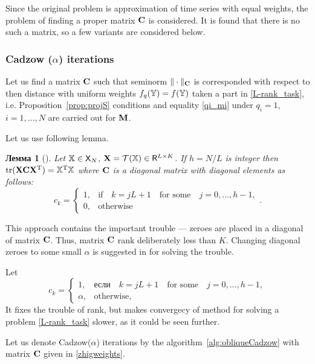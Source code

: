 \documentclass[12pt,a4paper,fleqn,leqno]{article}
\DeclareMathOperator{\tr}{tr}
\newtheorem{lemma}{Лемма}
\begin{document}
Since the original problem is approximation of time series with equal weights, the problem of finding a proper matrix $\mathbf{C}$ is considered.
It is found that there is no such a matrix, so a few variants are considered below.

\subsubsection{Cadzow ($\alpha$) iterations}
\label{sec:cadzow_alpha}
Let us find a matrix $\mathbf{C}$ such that seminorm $\|\cdot\|_{\mathbf{C}}$ is corresponded with respect to then distance with uniform weights $f_q(\mathbb{Y}) = f(\mathbb{Y})$ taken a part in \eqref{L-rank_task}, i.e. Proposition~\ref{prop:projS} conditions and equality \eqref{qi_mi} under $q_i = 1$, $i=1,\ldots,N$ are carried out for $\mathbf{M}$.

Let us use following lemma.

\begin{lemma}[\cite{Gillard2014}]
\label{zhiglemma}
Let $\mathbb{X} \in \mathsf{X}_N$, $\mathbf{X} = \mathcal{T}(\mathbb{X}) \in \mathsf{R}^{L \times K}$. If $h = N/L$ is integer then $\tr(\bfX \bfC \bfX^\rmT) = \tsX^\rmT \tsX$ where $\mathbf{C}$ is a diagonal matrix with diagonal elements as follows:
\begin{equation*}
c_k = \begin{cases}
1, & \text{if} \quad k = jL+1 \quad \text{for some} \quad j = 0, \ldots, h-1, \\
0, & \text{otherwise}
\end{cases}.
\end{equation*}
\end{lemma}

This approach contains the important trouble --- zeroes are placed in a diagonal of matrix $\mathbf{C}$. Thus, matrix $\mathbf{C}$ rank deliberately less than $K$. Changing diagonal zeroes to some small $\alpha$ is suggested in \cite{Gillard2014} for solving the trouble.

Let
\begin{equation}\label{zhigweights}
c_k = \begin{cases}
1, & \text{если} \quad k = jL+1 \quad \text{for some} \quad j = 0, \ldots, h-1, \\
\alpha, & \text{otherwise,}
\end{cases}
\end{equation}
It fixes the trouble of rank, but makes convergecy of method for solving a problem \eqref{L-rank_task} slower, as it could be seen further.

Let us denote Cadzow($\alpha$) iterations by the algorithm~\ref{alg:obliqueCadzow} with matrix $\mathbf{C}$  given in \eqref{zhigweights}.
\end{document}
